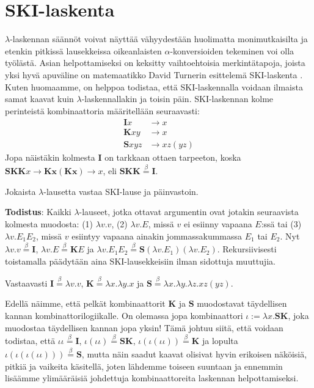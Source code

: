 \documentclass[a4paper,12pt]{amsart}
\begin{document}
\section{SKI-laskenta}
$\lambda$-laskennan säännöt voivat näyttää vähyydestään huolimatta monimutkaisilta ja etenkin pitkissä lausekkeissa oikeanlaisten $\alpha$-konversioiden tekeminen voi olla työlästä. Asian helpottamiseksi on keksitty vaihtoehtoisia merkintätapoja, joista yksi hyvä apuväline on matemaatikko David Turnerin esittelemä SKI-laskenta \cite{skilaskenta}. Kuten huomaamme, on helppoa todistaa, että SKI-laskennalla voidaan ilmaista samat kaavat kuin $\lambda$-laskennallakin ja toisin päin. SKI-laskennan kolme perinteistä kombinaattoria määritellään seuraavasti:
\begin{equation}\label{ski}
\begin{split}
\mathbf{I}x &\to x \\
\mathbf{K}xy &\to x \\
\mathbf{S}xyz &\to xz(yz)
\end{split}
\end{equation}
Jopa näistäkin kolmesta $\mathbf{I}$ on tarkkaan ottaen tarpeeton, koska $\mathbf{SKK}x\to\mathbf{Kx}(\mathbf{Kx})\to x$, eli $\mathbf{SKK}\stackrel{\beta}{=}\mathbf{I}$.
\begin{lause}\label{turner}
Jokaista $\lambda$-lausetta vastaa SKI-lause ja päinvastoin.

{\bf Todistus}: Kaikki $\lambda$-lauseet, jotka ottavat argumentin ovat jotakin seuraavista kolmesta muodosta: (1) $\lambda v.v$, (2) $\lambda v.E$, missä $v$ ei esiinny vapaana $E$:ssä tai (3) $\lambda v.E_1 E_2$, missä $v$ esiintyy vapaana ainakin jommassakummassa $E_1$ tai $E_2$. Nyt $\lambda v.v\stackrel{\beta}{=}\mathbf{I}$, $\lambda v.E\stackrel{\beta}{=}\mathbf{K}E$ ja $\lambda v.E_1 E_2\stackrel{\beta}{=}\mathbf{S}(\lambda v.E_1)(\lambda v.E_2)$. Rekursiivisesti toistamalla päädytään aina SKI-lausekkeisiin ilman sidottuja muuttujia.

Vastaavasti $\mathbf{I}\stackrel{\beta}{=}\lambda v.v$, $\mathbf{K}\stackrel{\beta}{=}\lambda x.\lambda y.x$ ja $\mathbf{S}\stackrel{\beta}{=}\lambda x.\lambda y.\lambda z.xz(yz)$.
\end{lause}
Edellä näimme, että pelkät kombinaattorit $\mathbf{K}$ ja $\mathbf{S}$ muodostavat täydellisen kannan kombinattorilogiikalle. On olemassa jopa kombinaattori $\iota:=\lambda x.\mathbf{SK}$, joka muodostaa täydellisen kannan jopa yksin! \cite{iota} Tämä johtuu siitä, että voidaan todistaa, että $\iota\iota\stackrel{\beta}{=}\mathbf{I}$, $\iota(\iota\iota)\stackrel{\beta}{=}\mathbf{SK}$, $\iota(\iota(\iota\iota))\stackrel{\beta}{=}\mathbf{K}$ ja lopulta $\iota(\iota(\iota(\iota\iota)))\stackrel{\beta}{=}\mathbf{S}$, mutta näin saadut kaavat olisivat hyvin erikoisen näköisiä, pitkiä ja vaikeita käsitellä, joten lähdemme toiseen suuntaan ja ennemmin lisäämme ylimääräisiä johdettuja kombinaattoreita laskennan helpottamiseksi.
\end{document}

